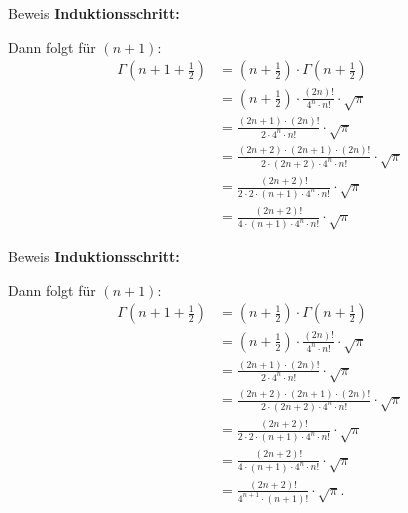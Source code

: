 \documentclass[10pt]{beamer}
\begin{document}
\begin{frame}{Beweis}
    \textbf{Induktionsschritt:}

    Dann folgt für \( \left( n + 1 \right) \):
    \begin{align*}
        \Gamma\left( n + 1 + \frac{1}{2} \right)
        & = \left( n + \frac{1}{2} \right) \cdot \Gamma\left( n + \frac{1}{2} \right) \\
        & = \left( n + \frac{1}{2} \right) \cdot \frac{\left( 2n \right)!}{4^{n} \cdot n!} \cdot \sqrt{\pi} \\
        & = \frac{\left( 2n + 1 \right) \cdot \left( 2n \right)!}{2 \cdot 4^{n} \cdot n!} \cdot \sqrt{\pi} \\
        & = \frac{\left( 2n + 2 \right) \cdot \left( 2n + 1 \right) \cdot \left( 2n \right)!}{2 \cdot \left( 2n + 2 \right) \cdot 4^{n} \cdot n!} \cdot \sqrt{\pi} \\
        & = \frac{\left( 2n + 2 \right)!}{2 \cdot 2 \cdot \left( n + 1 \right) \cdot 4^{n} \cdot n!} \cdot \sqrt{\pi} \\
        & = \frac{\left( 2n + 2 \right)!}{4 \cdot \left( n + 1 \right) \cdot 4^{n} \cdot n!} \cdot \sqrt{\pi}
    \end{align*}
\end{frame}



\begin{frame}{Beweis}
    \textbf{Induktionsschritt:}

    Dann folgt für \( \left( n + 1 \right) \):
    \begin{align*}
        \Gamma\left( n + 1 + \frac{1}{2} \right)
        & = \left( n + \frac{1}{2} \right) \cdot \Gamma\left( n + \frac{1}{2} \right) \\
        & = \left( n + \frac{1}{2} \right) \cdot \frac{\left( 2n \right)!}{4^{n} \cdot n!} \cdot \sqrt{\pi} \\
        & = \frac{\left( 2n + 1 \right) \cdot \left( 2n \right)!}{2 \cdot 4^{n} \cdot n!} \cdot \sqrt{\pi} \\
        & = \frac{\left( 2n + 2 \right) \cdot \left( 2n + 1 \right) \cdot \left( 2n \right)!}{2 \cdot \left( 2n + 2 \right) \cdot 4^{n} \cdot n!} \cdot \sqrt{\pi} \\
        & = \frac{\left( 2n + 2 \right)!}{2 \cdot 2 \cdot \left( n + 1 \right) \cdot 4^{n} \cdot n!} \cdot \sqrt{\pi} \\
        & = \frac{\left( 2n + 2 \right)!}{4 \cdot \left( n + 1 \right) \cdot 4^{n} \cdot n!} \cdot \sqrt{\pi} \\
        & = \frac{\left( 2n + 2 \right)!}{4^{n + 1} \cdot \left( n + 1 \right)!} \cdot \sqrt{\pi}.
    \end{align*}
\end{frame}
\end{document}

